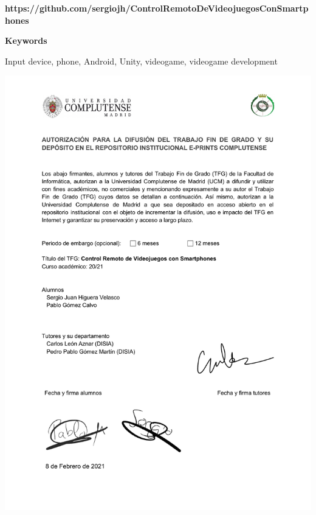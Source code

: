 \scriptsize

\textbf{https://github.com/sergiojh/ControlRemotoDeVideojuegosConSmartphones}

\normalsize

\addvspace{1cm}

\huge{\textbf{Keywords}}
\normalsize

\addvspace{1cm}

Input device, phone, Android, Unity, videogame, videogame development

\newpage

\includegraphics[width=1.0\textwidth]{./Imagenes/Vectorial/Autorizacion.pdf}


\endinput

